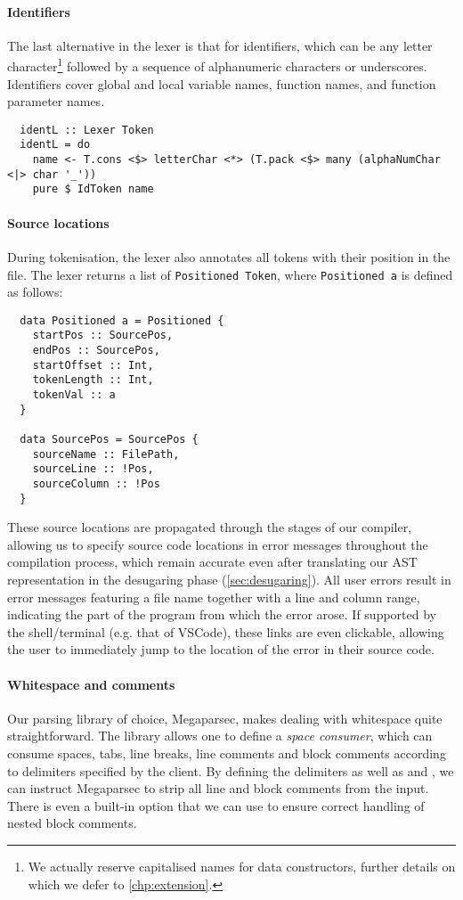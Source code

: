 \paragraph{Identifiers}
The last alternative in the lexer is that for identifiers, which can be any
letter character\footnote{We actually reserve capitalised names for data
constructors, further details on which we defer to \cref{chp:extension}.}
followed by a sequence of alphanumeric characters or underscores.
Identifiers cover global and local variable names, function names, and
function parameter names.

\begin{verbatim}
  identL :: Lexer Token
  identL = do
    name <- T.cons <$> letterChar <*> (T.pack <$> many (alphaNumChar <|> char '_'))
    pure $ IdToken name
\end{verbatim}


\paragraph{Source locations}
During tokenisation, the lexer also annotates all tokens with their position in
the file. The lexer returns a list of \texttt{Positioned Token},
where \texttt{Positioned a} is defined as follows:
%
\begin{verbatim}
  data Positioned a = Positioned {
    startPos :: SourcePos,
    endPos :: SourcePos,
    startOffset :: Int,
    tokenLength :: Int,
    tokenVal :: a
  }

  data SourcePos = SourcePos {
    sourceName :: FilePath,
    sourceLine :: !Pos,
    sourceColumn :: !Pos
  }
\end{verbatim}

These source locations are propagated through the stages of our compiler,
allowing us to specify source code locations in error messages throughout the
compilation process, which remain accurate even after translating our AST
representation in the desugaring phase (\cref{sec:desugaring}).
%
All user errors result in error messages featuring a file name together with a
line and column range, indicating the part of the program from which the error
arose. If supported by the shell/terminal (e.g. that of VSCode), these links are
even clickable, allowing the user to immediately jump to the location of the
error in their source code.

\paragraph{Whitespace and comments}
Our parsing library of choice, Megaparsec, makes dealing with whitespace quite
straightforward. The library allows one to define a \emph{space consumer}, which
can consume spaces, tabs, line breaks, line comments and block comments
according to delimiters specified by the client.
By defining the delimiters \code{//} as well as \code{/*} and \code{*/}, we can
instruct Megaparsec to strip all line and block comments from the input.
There is even a built-in option that we can use to ensure correct handling of
nested block comments.

